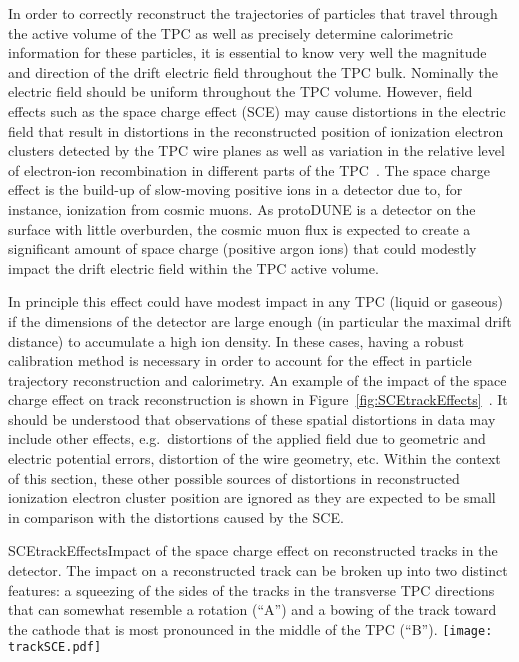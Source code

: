 In order to correctly reconstruct the trajectories of particles that travel through the active volume of the TPC as well as precisely determine calorimetric information for these particles, it is essential to know very well the magnitude and direction of the drift electric field throughout the TPC bulk.  Nominally the electric field should be uniform throughout the TPC volume.  However, field effects such as the space charge effect (SCE) may cause distortions in the electric field that result in distortions in the reconstructed position of ionization electron clusters detected by the TPC wire planes as well as variation in the relative level of electron-ion recombination in different parts of the TPC~\cite{KirkSCE}.  The space charge effect is the build-up of slow-moving positive ions in a detector due to, for instance, ionization from cosmic muons.  As protoDUNE is a detector on the surface with little overburden, the cosmic muon flux is expected to create a significant amount of space charge (positive argon ions) that could modestly impact the drift electric field within the TPC active volume.

In principle this effect could have modest impact in any TPC (liquid or gaseous) if the dimensions of the detector are large enough (in particular the maximal drift distance) to accumulate a high ion density.  In these cases, having a robust calibration method is necessary in order to account for the effect in particle trajectory reconstruction and calorimetry.  An example of the impact of the space charge effect on track reconstruction is shown in Figure~\ref{fig:SCEtrackEffects}~\cite{Mooney:2015kke}.  It should be understood that observations of these spatial distortions in data may include other effects, e.g.\ distortions of the applied field due to geometric and electric potential errors, distortion of the wire geometry, etc.  Within the context of this section, these other possible sources of distortions in reconstructed ionization electron cluster position are ignored as they are expected to be small in comparison with the distortions caused by the SCE.

\begin{cdrfigure}{SCEtrackEffects}{Impact of the space charge effect on reconstructed tracks in the detector.  The impact on a reconstructed track can be broken up into two distinct features:  a squeezing of the sides of the tracks in the transverse TPC directions that can somewhat resemble a rotation (``A'') and a bowing of the track toward the cathode that is most pronounced in the middle of the TPC (``B'').}
\texttt{[image: trackSCE.pdf]}
\end{cdrfigure}


